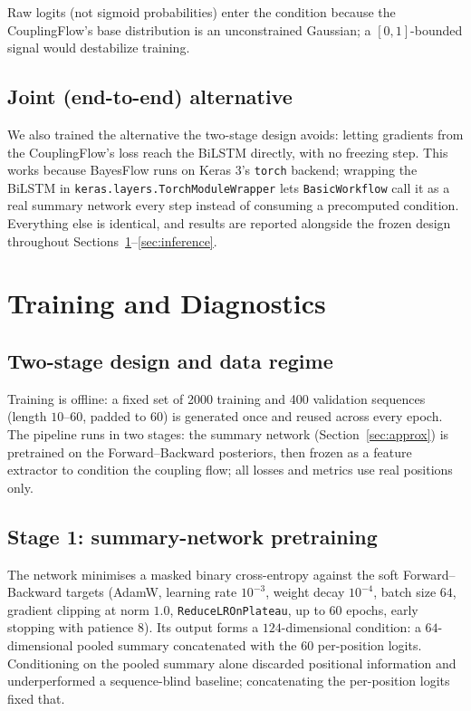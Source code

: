 \documentclass[12pt]{article}
\begin{document}
Raw logits (not sigmoid probabilities) enter the condition because the
CouplingFlow's base distribution is an unconstrained Gaussian; a $[0,1]$-bounded
signal would destabilize training.

\subsection{Joint (end-to-end) alternative}
\label{sec:joint}

We also trained the alternative the two-stage design avoids: letting gradients
from the CouplingFlow's loss reach the BiLSTM directly, with no freezing step.
This works because BayesFlow runs on Keras 3's \texttt{torch} backend;
wrapping the BiLSTM in \texttt{keras.\allowbreak layers.\allowbreak TorchModuleWrapper} lets
\texttt{BasicWorkflow} call it as a real summary network every step instead
of consuming a precomputed condition. Everything else is identical, and
results are reported alongside
the frozen design throughout Sections~\ref{sec:training}--\ref{sec:inference}.


\section{Training and Diagnostics}
\label{sec:training}

\subsection{Two-stage design and data regime}

Training is offline: a fixed set of 2000 training and 400
validation sequences (length $10$--$60$, padded to $60$) is generated once
and reused across every epoch. The pipeline runs in two stages: the
summary network (Section~\ref{sec:approx}) is pretrained on the
Forward--Backward posteriors, then frozen as a feature extractor to
condition the coupling flow; all losses and metrics use real positions only.

\subsection{Stage 1: summary-network pretraining}

The network minimises a masked binary cross-entropy against the soft
Forward--Backward targets (AdamW, learning rate $10^{-3}$, weight decay
$10^{-4}$, batch size $64$, gradient clipping at norm $1.0$,
\texttt{ReduceLROnPlateau}, up to $60$ epochs, early stopping with patience
$8$). Its output forms a $124$-dimensional
condition: a $64$-dimensional pooled summary concatenated with the $60$
per-position logits. Conditioning on the pooled summary
alone discarded positional information and underperformed a sequence-blind
baseline; concatenating the per-position logits fixed that.
\end{document}
